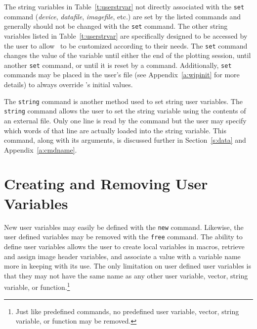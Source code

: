 The string variables in Table~\ref{t:userstrvar}
not directly associated with the 
{\tt set} command ({\em device}, {\em datafile}, {\em imagefile}, etc.)
are set by the listed commands and generally should not be changed with
the {\tt set} command.
The other string variables listed in Table~\ref{t:userstrvar}
are specifically designed to be accessed by the user
to allow \wip\ to be customized according to their needs.
The {\tt set} command changes the value of the variable until either
the end of the plotting session, until another {\tt set} command,
or until it is reset by a command.
Additionally, {\tt set} commands may be placed in the user's
\wipinit{} file (see Appendix~\ref{a:wipinit} for more
details) to always override \wip's initial values.

The {\tt string} command
is another method used to set string user variables.
The {\tt string} command allows the user to set the string variable
using the contents of an external file.
Only one line is read by the command but the user may specify which
words of that line are actually loaded into the string variable.
This command, along with its arguments, is discussed further
in Section~\ref{s:data} and Appendix~\ref{a:cmdname}.%

\section		{Creating and Removing User Variables}

New user variables may easily be defined with the
{\tt new}%
%
command.
Likewise, the user defined variables may be removed with the
{\tt free}%
%
command.
The ability to define user variables allows the user
to create local variables in macros,
retrieve and assign image header variables,
and associate a value with a variable name more in keeping with its use.
The only limitation on user defined user variables is that they may not
have the same name as any other user variable, vector, string variable,
or function.\footnote{Just like predefined commands,
no predefined user variable, vector, string variable,
or function may be removed.}

